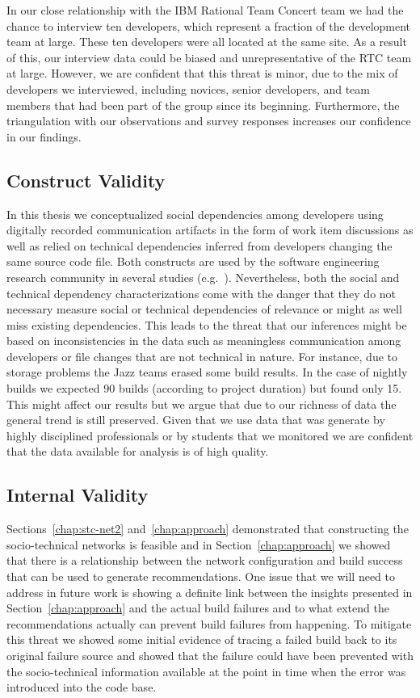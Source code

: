 In our close relationship with the IBM Rational Team Concert team we had the chance to interview ten developers, which represent a fraction of the development team at large. These ten developers were all located at the same site. As a result of this, our interview data could be biased and unrepresentative of the RTC team at large.
However, we are confident that this threat is minor, due to the mix of developers we interviewed, including novices, senior developers, and team members that had been part of the group since its beginning.
Furthermore, the triangulation with our observations and survey responses increases our confidence in our findings.

\subsection{Construct Validity}
In this thesis we conceptualized social dependencies among developers using digitally recorded communication artifacts in the form of work item discussions as well as relied on technical dependencies inferred from developers changing the same source code file.
Both constructs are used by the software engineering research community in several studies (e.g.~\cite{cataldo:cscw:2006}).
Nevertheless, both the social and technical dependency characterizations come with the danger that they do not necessary measure social or technical dependencies of relevance or might as well miss existing dependencies.
This leads to the threat that our inferences might be based on inconsistencies in the data such as meaningless communication among developers or file changes that are not technical in nature.
For instance, due to storage problems the Jazz teams erased some build results. In the case of
nightly builds we expected 90 builds (according to project duration) but found
only 15. This might affect our results but we argue that due to our richness of
data the general trend is still preserved.
Given that we use data that was generate by highly disciplined professionals or by students that we monitored we are confident that the data available for analysis is of high quality.

\subsection{Internal Validity}
Sections~\ref{chap:stc-net2} and~\ref{chap:approach} demonstrated that constructing the socio-technical networks is feasible and in Section~\ref{chap:approach} we showed that there is a relationship between the network configuration and build success that can be used to generate recommendations.
One issue that we will need to address in future work is showing a definite link between the insights presented in Section~\ref{chap:approach} and the actual build failures and to what extend the recommendations actually can prevent build failures from happening. 
To mitigate this threat we showed some initial evidence of tracing a failed build back to its original failure source and showed that the failure could have been prevented with the socio-technical information available at the point in time when the error was introduced into the code base.

